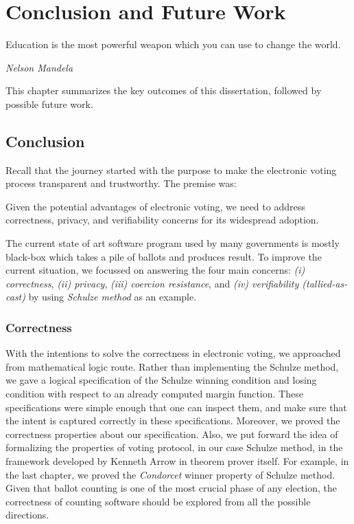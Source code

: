 \chapter{Conclusion and Future Work}
\label{cha:conc}

\epigraph{Education is the most powerful weapon which you can use to change the world.} 
{\textit{Nelson Mandela}}

This chapter summarizes the key outcomes of this dissertation, followed by possible 
future work. 

\section{Conclusion}
Recall that the journey started with the purpose to make the electronic voting 
process transparent and trustworthy.  The premise was:

\begin{displayquote}
Given the potential advantages of electronic voting, we need to address correctness,
privacy, and verifiability concerns for its widespread adoption.
\end{displayquote}

The current state of 
art software program used by many governments is mostly black-box which 
takes a pile of ballots and produces result.  To improve the current situation, 
we focussed on answering the 
four main concerns: \textit{(i) correctness}, \textit{(ii) privacy},
\textit{(iii) coercion resistance}, and \textit{(iv) verifiability (tallied-as-cast)} by 
using \textit{Schulze method} as an example. 

\subsection{Correctness}
With the intentions to solve the 
correctness in electronic voting, we approached from 
mathematical logic route.  Rather than implementing the Schulze method, 
we gave a logical specification of the Schulze winning condition and losing 
condition with respect to an already computed margin function. 
These specifications were simple enough that 
one can inspect them, and 
make sure that the intent is captured correctly in these specifications. 
Moreover, we proved the correctness properties about our specification.
Also, we put forward the idea of formalizing the properties 
of voting protocol, in our case Schulze method, in the framework developed by Kenneth Arrow 
in theorem prover itself. For example, 
in the last chapter, we proved the \textit{Condorcet} winner property 
of Schulze method. Given that ballot counting is one of the most 
crucial phase of any election, the correctness of counting software 
should be explored from all the possible directions. 

